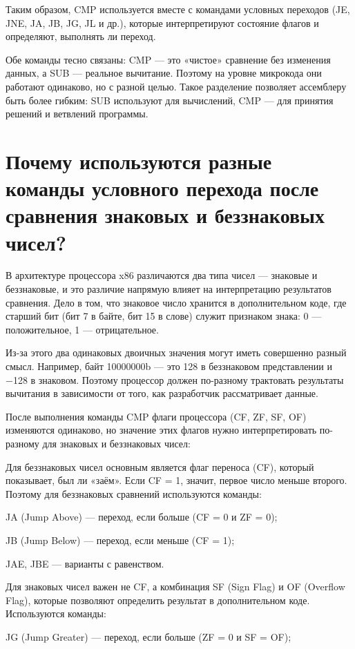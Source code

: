 Таким образом, CMP используется вместе с командами условных переходов (JE, JNE, JA, JB, JG, JL и др.), которые интерпретируют состояние флагов и определяют, выполнять ли переход.

Обе команды тесно связаны: CMP — это «чистое» сравнение без изменения данных, а SUB — реальное вычитание. Поэтому на уровне микрокода они работают одинаково, но с разной целью. Такое разделение позволяет ассемблеру быть более гибким: SUB используют для вычислений, CMP — для принятия решений и ветвлений программы.

\section{Почему используются разные команды условного перехода после сравнения знаковых и беззнаковых чисел?}

В архитектуре процессора x86 различаются два типа чисел — знаковые и беззнаковые, и это различие напрямую влияет на интерпретацию результатов сравнения. Дело в том, что знаковое число хранится в дополнительном коде, где старший бит (бит 7 в байте, бит 15 в слове) служит признаком знака: 0 — положительное, 1 — отрицательное.

Из-за этого два одинаковых двоичных значения могут иметь совершенно разный смысл. Например, байт 10000000b — это 128 в беззнаковом представлении и −128 в знаковом. Поэтому процессор должен по-разному трактовать результаты вычитания в зависимости от того, как разработчик рассматривает данные.

После выполнения команды CMP флаги процессора (CF, ZF, SF, OF) изменяются одинаково, но значение этих флагов нужно интерпретировать по-разному для знаковых и беззнаковых чисел:

Для беззнаковых чисел основным является флаг переноса (CF), который показывает, был ли «заём». Если CF = 1, значит, первое число меньше второго.
Поэтому для беззнаковых сравнений используются команды:

JA (Jump Above) — переход, если больше (CF = 0 и ZF = 0);

JB (Jump Below) — переход, если меньше (CF = 1);

JAE, JBE — варианты с равенством.

Для знаковых чисел важен не CF, а комбинация SF (Sign Flag) и OF (Overflow Flag), которые позволяют определить результат в дополнительном коде.
Используются команды:

JG (Jump Greater) — переход, если больше (ZF = 0 и SF = OF);

